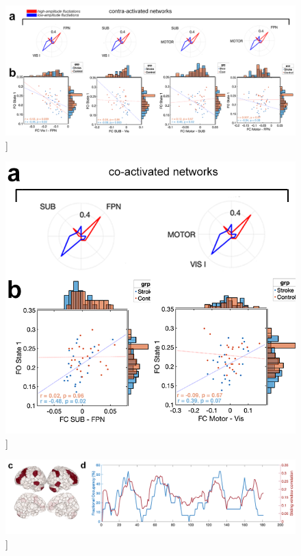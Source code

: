 \documentclass[phd,tocprelim]{cornell}
\renewcommand{\caption}[1]{\singlespacing\hangcaption{#1}\normalspacing}
\begin{document}
\null
\vfill
\clearpage
\null
\vfill
\begin{figure}[h!]
		\ContinuedFloat
		\captionsetup{labelformat=adja-page}
    \centering
    \includegraphics[width=1\textwidth]{chapter2/Figure6ab1.png}
    \caption[]{}
\end{figure}
\null
\vfill
\clearpage    
    \null
\vfill
\begin{figure}[h!]
		\ContinuedFloat
		\captionsetup{labelformat=adja-page}
    \centering
    \includegraphics[width=1\textwidth]{chapter2/Figure6ab2.png}
    \caption[]{}
\end{figure}
\null
\vfill
\clearpage    
    \null
\vfill
\begin{figure}[h!]
		\ContinuedFloat
		\captionsetup{labelformat=adja-page}
    \centering
    \includegraphics[width=1\textwidth]{chapter2/Figure6cd.png}
    \caption[]{}
\end{figure}
\end{document}
